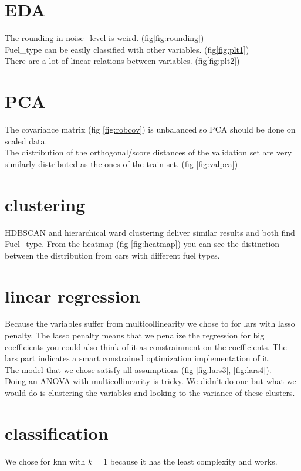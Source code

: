 \documentclass{article}
\begin{document}
\section{EDA}

The rounding in noise\_level is weird. (fig\ref*{fig:rounding})\\
Fuel\_type can be easily classified with other variables. (fig\ref*{fig:plt1})\\
There are a lot of linear relations between variables. (fig\ref*{fig:plt2})



\section{PCA}
The covariance matrix (fig \ref*{fig:robcov}) is unbalanced so PCA
should be done on scaled data.\\
The distribution of the orthogonal/score distances of the validation set are very similarly
distributed as the ones of the train set. (fig \ref*{fig:valpca})


\section{clustering}
HDBSCAN and hierarchical ward clustering deliver similar results and both
find Fuel\_type. From the heatmap (fig \ref*{fig:heatmap}) you can see the distinction
between the distribution from cars with different fuel types.


\section{linear regression}
Because the variables suffer from multicollinearity we chose 
to for lars with lasso penalty. The lasso penalty means 
that we penalize the regression for big coefficients you could
also think of it as constrainment on the coefficients. The lars part
indicates a smart constrained optimization implementation of it.\\
The model that we chose satisfy all assumptions (fig \ref*{fig:lars3}, \ref*{fig:lars4}).\\
Doing an ANOVA with multicollinearity is tricky. We didn't do one but what we would do
is clustering the variables and looking to the variance of these clusters.

\section{classification}
We chose for knn with $k=1$ because it has the least complexity and works.
\end{document}
